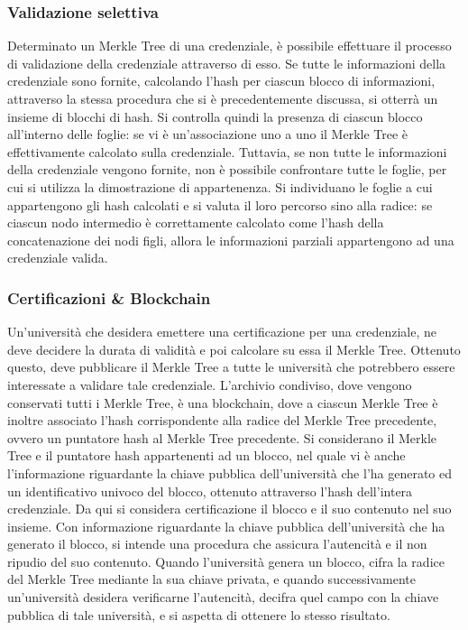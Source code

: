 \documentclass[a4paper,12pt]{article}
\begin{document}
\subsubsection{Validazione selettiva}
Determinato un Merkle Tree di una credenziale, è possibile effettuare il processo di validazione della credenziale attraverso di esso. Se tutte le informazioni della credenziale sono fornite, calcolando l'hash per ciascun blocco di informazioni, attraverso la stessa procedura che si è precedentemente discussa, si otterrà un insieme di blocchi di hash. Si controlla quindi la presenza di ciascun blocco all'interno delle foglie: se vi è un'associazione uno a uno il Merkle Tree è effettivamente calcolato sulla credenziale. 
\newline Tuttavia, se non tutte le informazioni della credenziale vengono fornite, non è possibile confrontare tutte le foglie, per cui si utilizza la dimostrazione di appartenenza. Si individuano le foglie a cui appartengono gli hash calcolati e si valuta il loro percorso sino alla radice: se ciascun nodo intermedio è correttamente calcolato come l'hash della concatenazione dei nodi figli, allora le informazioni parziali appartengono ad una credenziale valida. 
\subsubsection{Certificazioni \& Blockchain} 
Un'università che desidera emettere una certificazione per una credenziale, ne deve decidere la durata di validità e poi calcolare su essa il Merkle Tree. Ottenuto questo, deve pubblicare il Merkle Tree a tutte le università che potrebbero essere interessate a validare tale credenziale. L'archivio condiviso, dove vengono conservati tutti i Merkle Tree, è una blockchain, dove a ciascun Merkle Tree è inoltre associato l'hash corrispondente alla radice del Merkle Tree precedente, ovvero un puntatore hash al Merkle Tree precedente.
\newline Si considerano il Merkle Tree e il puntatore hash 
appartenenti ad un blocco, nel quale vi è anche l'informazione riguardante la chiave pubblica dell'università che l'ha generato ed un identificativo univoco del blocco, ottenuto attraverso l'hash dell'intera credenziale. 
Da qui si considera certificazione il blocco e il suo contenuto nel suo insieme. 
\newline Con informazione riguardante la chiave pubblica dell'università che ha generato il blocco, si intende una procedura che assicura l'autencità e il non ripudio del suo contenuto.
Quando l'università genera un blocco, cifra la radice del Merkle Tree mediante la sua chiave privata, e quando successivamente un'università desidera verificarne l'autencità, decifra quel campo con la chiave pubblica di tale università, e si aspetta di ottenere lo stesso risultato.
\end{document}
